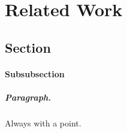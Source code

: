 \chapter{Related Work}
\section{Section}
%
\subsubsection{Subsubsection}

\paragraph{Paragraph.} Always with a point.

